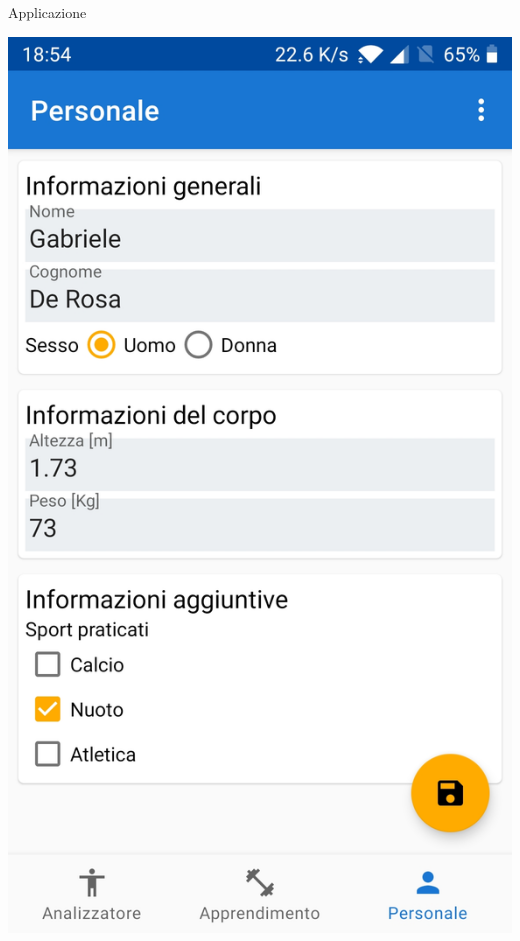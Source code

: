 \begin{tframe}{Applicazione}
\begin{minipage}{0.65\textwidth}
        \centering\includegraphics[scale = 0.06]{assets/images/screenshots/form.jpg}

    \end{minipage}%

\end{tframe}
